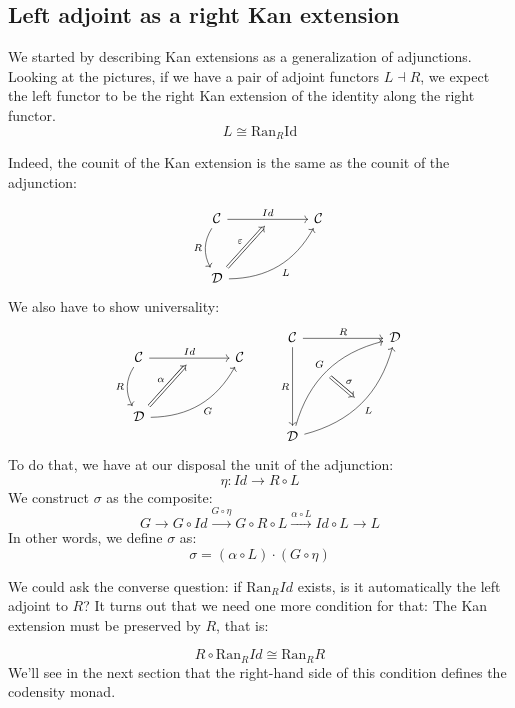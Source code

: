 \documentclass[DaoFP]{subfiles}
\begin{document}
 \subsection{Left adjoint as a right Kan extension}
 
 We started by describing Kan extensions as a generalization of adjunctions. Looking at the pictures, if we have a pair of adjoint functors $L \dashv R$, we expect the left functor to be the right Kan extension of the identity along the right functor.
 \[ L \cong \text{Ran}_R \text{Id} \]
 
 Indeed, the counit of the Kan extension is the same as the counit of the adjunction:

 \[
 \begin{tikzcd} [row sep=1cm, column sep=1cm]
 \cat C
 \arrow[rr, "Id", "" {name=ID, below} ]
 \arrow[d, bend right, "R"']
 && \cat C
 \\
 \cat D
  \arrow[urr, bend right, "L"']
 \arrow[Rightarrow, "\varepsilon",  to=ID]
 \end{tikzcd}
\]
We also have to show universality:
\[
 \begin{tikzcd} [row sep=1cm, column sep=1cm]
 \cat C
 \arrow[rr, "Id", "" {name=ID, below} ]
 \arrow[d, bend right, "R"']
 && \cat C
 \\
 \cat D
  \arrow[urr, bend right, "G"']
 \arrow[Rightarrow, "\alpha",  to=ID]
 \end{tikzcd}
 \qquad %
\begin{tikzcd}[row sep=2cm, column sep=2cm]
\cat C  \ar[d, "R"', "" {name=P}]
            \ar[r, "R", ""  {name=F, below, near start, bend right}]
&
\cat D
\\
\cat D
    \ar[ur, bend left, "G", "" {name=G, below}]
    \ar[ur, bend right, "L"', "" {name=Ran}]
\arrow[Rightarrow, "\sigma", from=G, to=Ran]
\end{tikzcd}
\]
To do that, we have at our disposal the unit of the adjunction:
\[ \eta \colon Id \to R \circ L \]
We construct $\sigma$ as the composite:
\[ G \rightarrow G \circ Id \xrightarrow{G \circ \eta} G \circ R \circ L \xrightarrow{\alpha \circ L} Id \circ L \rightarrow L\]
In other words, we define $\sigma$ as:
\[ \sigma = (\alpha \circ L) \cdot (G \circ \eta) \]

We could ask the converse question: if $\text{Ran}_R Id$ exists, is it automatically the left adjoint to $R$? It turns out that we need one more condition for that: The Kan extension must be preserved by $R$, that is:

\[ R \circ \text{Ran}_R Id \cong \text{Ran}_R R \]
We'll see in the next section that the right-hand side of this condition defines the codensity monad.
\end{document}
